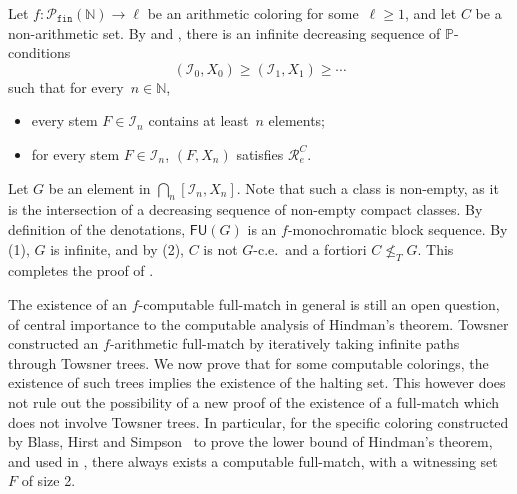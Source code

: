 \documentclass[10pt,a4paper]{article}
\def\PP{\mathbb{P}}
\def\I{\mathcal{I}}
\def\Rc{\mathcal{R}}
\newcommand{\NN}[0]{\mathbb{N}}
\newcommand{\Pfin}{\mathcal{P}_{\mathtt{fin}}}
\newcommand{\FU}[0]{\mathsf{FU}} %
\numberwithin{theorem}{section}
\begin{document}
Let $f : \Pfin(\NN) \to \ell$ be an arithmetic coloring for some~$\ell \geq 1$, and let $C$ be a non-arithmetic set.
By  and , there is an infinite decreasing sequence of $\PP$-conditions
$$
(\I_0, X_0) \geq (\I_1, X_1) \geq \cdots
$$
such that for every~$n \in \NN$,
\begin{itemize}
    \item[(1)] every stem $F \in \I_n$ contains at least~$n$ elements;
    \item[(2)] for every stem $F \in \I_n$, $(F, X_n)$ satisfies $\Rc^C_e$.
\end{itemize}
Let $G$ be an element in $\bigcap_n [\I_n, X_n]$. Note that such a class is non-empty, as it is the intersection of a decreasing sequence of non-empty compact classes. By definition of the denotations, $\FU(G)$ is an $f$-monochromatic block sequence. By (1), $G$ is infinite, and by (2), $C$ is not $G$-c.e.\ and a fortiori $C \not \leq_T G$. This completes the proof of .
\bigskip

The existence of an $f$-computable full-match in general is still an open question, of central importance to the computable analysis of Hindman's theorem. Towsner constructed an $f$-arithmetic full-match by iteratively taking infinite paths through Towsner trees. We now prove that for some computable colorings, the existence of such trees implies the existence of the halting set. This however does not rule out the possibility of a new proof of the existence of a full-match which does not involve Towsner trees. In particular, for the specific coloring constructed by Blass, Hirst and Simpson~\cite{blassLogicalAnalysisTheorems1987} to prove the lower bound of Hindman's theorem, and used in , there always exists a computable full-match, with a witnessing set~$F$ of size 2.
\end{document}
